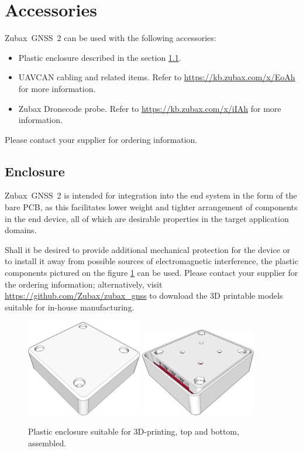 \documentclass{zubaxdoc}
\begin{document}
\section{Accessories}

Zubax~GNSS~2 can be used with the following accessories:

\begin{itemize}
    \item Plastic enclosure described in the section \ref{sec:enclosure}.
    \item UAVCAN cabling and related items. Refer to \url{https://kb.zubax.com/x/EoAh} for more information.
    \item Zubax Dronecode probe. Refer to \url{https://kb.zubax.com/x/iIAh} for more information.
\end{itemize}

Please contact your supplier for ordering information.

\subsection{Enclosure}\label{sec:enclosure}

Zubax~GNSS~2 is intended for integration into the end system in the form of the bare PCB,
as this facilitates lower weight and tighter arrangement of components
in the end device, all of which are desirable properties in the target application domains.

Shall it be desired to provide additional mechanical protection for the device or to install it away from possible sources of electromagnetic interference, the plastic components pictured on the figure \ref{enclosure} can be used.
Please contact your supplier for the ordering information;
alternatively, visit \url{https://github.com/Zubax/zubax_gnss} to download
the 3D printable models suitable for in-house manufacturing.

\begin{figure}[hbt]
	\centering
	\includegraphics[width=0.45\textwidth]{enclosure_assembled_top}
	\includegraphics[width=0.45\textwidth]{enclosure_assembled_bottom}
	\caption{Plastic enclosure suitable for 3D-printing, top and bottom, assembled.\label{enclosure}}
\end{figure}
\end{document}

